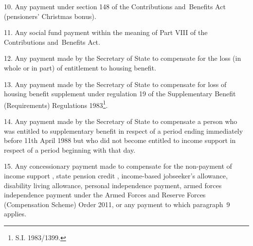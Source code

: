 \documentclass[12pt,a4paper]{article}
\begin{document}
\medskip

10.  Any payment under section 148 of the Contributions and~Benefits Act (pensioners' Christmas bonus).

\medskip

11.  Any social fund payment within the meaning of Part VIII of the Contributions and~Benefits Act.

\medskip

12.  Any payment made by the Secretary of State to compensate for the loss (in whole or in part) of entitlement to housing benefit.

\medskip

13.  Any payment made by the Secretary of State to compensate for loss of housing benefit supplement under regulation 19 of the Supplementary Benefit (Requirements) Regulations 1983\footnote{\frenchspacing S.I. 1983/1399.}.

\medskip

14.  Any payment made by the Secretary of State to compensate a person who was entitled to supplementary benefit in respect of a period ending immediately before 11th April 1988 but who did not become entitled to income support in respect of a period beginning with that day.

\medskip

15.  Any concessionary payment made to compensate for the non-payment of income support%
, state pension credit%
, income-based jobseeker’s allowance,  %
disability living allowance, 
personal independence payment,  %
armed forces independence payment under the Armed Forces and Reserve Forces (Compensation Scheme) Order 2011,  %
or any payment to which paragraph~9 applies.

\end{document}

